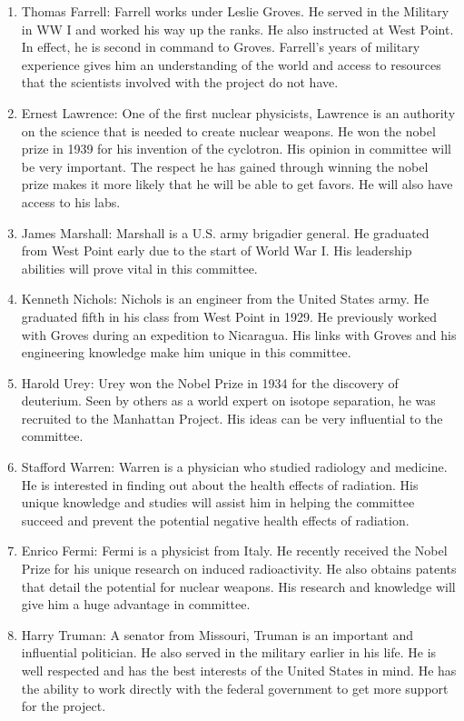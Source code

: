 \documentclass[11 pt, twoside]{article}
\begin{document}
\begin{enumerate}
\item Thomas Farrell: Farrell works under Leslie Groves. He served in the Military in WW I and worked his way up the ranks. He also instructed at West Point. In effect, he is second in command to Groves. Farrell’s years of military experience gives him an understanding of the world and access to resources that the scientists involved with the project do not have. 
\item Ernest Lawrence: One of the first nuclear physicists, Lawrence is an authority on the science that is needed to create nuclear weapons. He won the nobel prize in 1939 for his invention of the cyclotron. His opinion in committee will be very important. The respect he has gained through winning the nobel prize makes it more likely that he will be able to get favors. He will also have access to his labs.
\item James Marshall: Marshall is a U.S. army brigadier general. He graduated from West Point early due to the start of World War I. His leadership abilities will prove vital in this committee.
\item Kenneth Nichols: Nichols is an engineer from the United States army. He graduated fifth in his class from West Point in 1929. He previously worked with Groves during an expedition to Nicaragua. His links with Groves and his engineering knowledge make him unique in this committee.  
\item Harold Urey: Urey won the Nobel Prize in 1934 for the discovery of deuterium. Seen by others as a world expert on isotope separation, he was recruited to the Manhattan Project. His ideas can be very influential to the committee.
\item Stafford Warren: Warren is a physician who studied radiology and medicine. He is interested in   finding out about the health effects of radiation. His unique knowledge and studies will assist him in helping the committee succeed and prevent the potential negative health effects of radiation.
\item Enrico Fermi: Fermi is a physicist from Italy. He recently received the Nobel Prize for his unique research on induced radioactivity. He also obtains patents that detail the potential for nuclear weapons. His research and knowledge will give him a huge advantage in committee.  
\item Harry Truman: A senator from Missouri, Truman is an important and influential politician. He also   served in the military earlier in his life. He is well respected and has the best interests of the United States in mind. He has the ability to work directly with the federal government to get more support for the project.

\end{enumerate}
\end{document}
